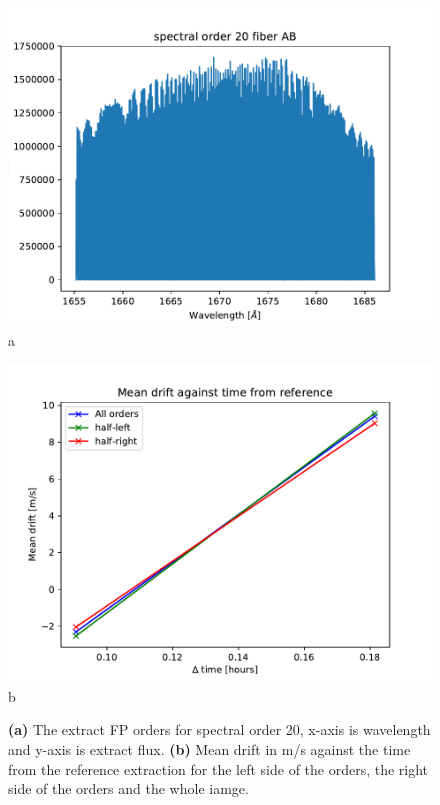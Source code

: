 \begin{figure}

\begin{center}
\begin{minipage}{.495\textwidth}
\begin{center}
\includegraphics[width=\textwidth]{Figures/cal_driftpeak_e2ds_1.pdf}
a
\end{center}
\end{minipage}%
\begin{minipage}{.495\textwidth}
\begin{center}
\includegraphics[width=\textwidth]{Figures/cal_driftpeak_e2ds_2.pdf}
b
\end{center}
\end{minipage}%
\end{center}

\caption{\textbf{(a)} The extract FP orders for spectral order 20, x-axis is wavelength and y-axis is extract flux.  \textbf{(b)} Mean drift in m/s against the time from the reference extraction for the left side of the orders, the right side of the orders and the whole iamge. \label{figure:cal_driftpeak_e2ds}}
\end{figure}

